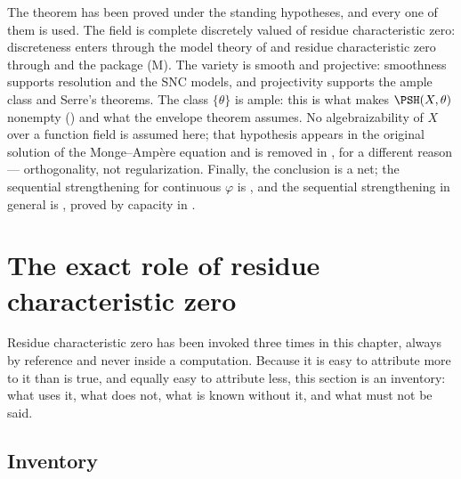\begin{remark}
\label{rem:ch22-regularization-hypotheses}
The theorem has been proved under the standing hypotheses, and every one of
them is used.  The field is complete discretely valued of residue
characteristic zero: discreteness enters through the model theory of
 and residue characteristic zero through
 and the package \textup{(M)}.  The variety is smooth
and projective: smoothness supports resolution and the SNC models, and
projectivity supports the ample class and Serre's theorems.  The class
$\{\theta\}$ is ample: this is what makes
$\PSH(X,\theta)$ nonempty () and
what the envelope theorem assumes.  No algebraizability of $X$ over a
function field is assumed here; that hypothesis appears in the original
solution of the Monge--Amp\`ere equation and is removed in
, for a different reason ---
orthogonality, not regularization.  Finally, the conclusion is a net; the
sequential strengthening for continuous $\varphi$ is
, and the sequential
strengthening in general is , proved
by capacity in .
\end{remark}

\section{The exact role of residue characteristic zero}
\label{sec:ch22-char-zero}

Residue characteristic zero has been invoked three times in this chapter,
always by reference and never inside a computation.  Because it is easy to
attribute more to it than is true, and equally easy to attribute less, this
section is an inventory: what uses it, what does not, what is known without
it, and what must not be said.

\subsection{Inventory}

